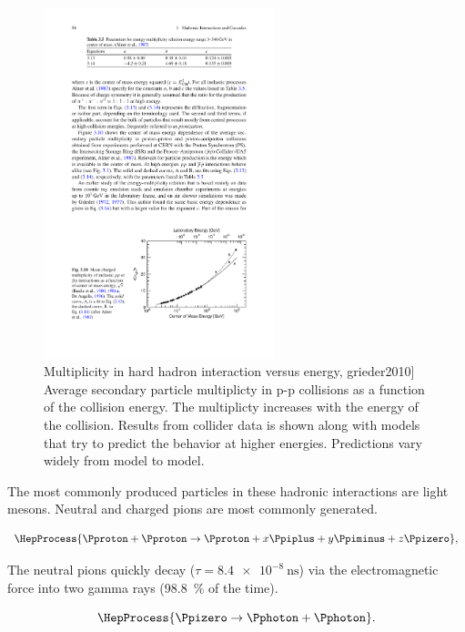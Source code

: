\begin{figure}
    \centering
    \includegraphics[width=0.6\textwidth]
                    {plots/cosmic-rays/multiplicity}
    \caption{Multiplicity in hard hadron interaction versus energy, grieder2010]
Average secondary particle multiplicty in p-p collisions as a function of the collision energy. The multiplicty increases with the energy of the collision. Results from collider data is shown along with models that try to predict the behavior at higher energies. Predictions vary widely from model to model.}
    \label{fig:multiplicity}
\end{figure}

The most commonly produced particles in these hadronic interactions are light mesons. Neutral and charged pions are most commonly generated.

\begin{equation}
\HepProcess{\Pproton + \Pproton \to \Pproton + x \Ppiplus + y \Ppiminus + z \Ppizero},
\end{equation}

The neutral pions quickly decay ($\tau = \SI{8.4e-8}{\ns}$) via the electromagnetic force into two gamma rays (\SI{98.8}{\percent} of the time).

\begin{equation}
\HepProcess{\Ppizero \to \Pphoton + \Pphoton}.
\end{equation}


